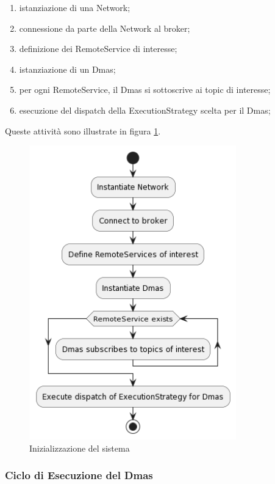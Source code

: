 \begin{enumerate}
    \item istanziazione di una Network;
    \item connessione da parte della Network al broker;
    \item definizione dei RemoteService di interesse;
    \item istanziazione di un Dmas;
    \item per ogni RemoteService, il Dmas si sottoscrive ai topic di interesse;
    \item esecuzione del dispatch della ExecutionStrategy scelta per il Dmas;
\end{enumerate}

Queste attività sono illustrate in figura \ref{fig:initialization}.

\begin{figure}
    \centering
    \includegraphics[width=0.8\textwidth]{figures/activity-dmas.png}
    \caption{Inizializzazione del sistema}
    \label{fig:initialization}
\end{figure}

\subsubsection{Ciclo di Esecuzione del Dmas}

